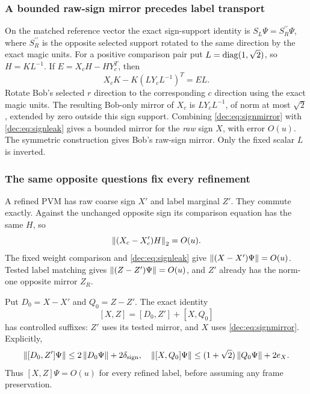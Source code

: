 \subsubsection{A bounded raw-sign mirror precedes label transport}
On the matched reference vector the exact sign-support identity is $S_L\Psi=S^{\prime\prime}_R\Psi$, where $S^{\prime\prime}_R$ is the opposite selected support rotated to the same direction by the exact magic units. For a positive comparison pair put $L=\operatorname{diag}(1,\sqrt2)$, so $H=KL^{-1}$. If $E=X_cH-HY_c^T$, then
\begin{equation}\label{dec:eq:signmirror}
X_cK-K(LY_cL^{-1})^T=EL.
\end{equation}
Rotate Bob's selected $r$ direction to the corresponding $c$ direction using the exact magic units. The resulting Bob-only mirror of $X_c$ is $LY_cL^{-1}$, of norm at most $\sqrt2$, extended by zero outside this sign support. Combining \eqref{dec:eq:signmirror} with \eqref{dec:eq:signleak} gives a bounded mirror for the \emph{raw} sign $X$, with error $O(u)$. The symmetric construction gives Bob's raw-sign mirror. Only the fixed scalar $L$ is inverted.

\subsubsection{The same opposite questions fix every refinement}
A refined PVM has raw coarse sign $X'$ and label marginal $Z'$. They commute exactly. Against the unchanged opposite sign its comparison equation has the same $H$, so
\[
\left\lVert(X_c-X_c')H\right\rVert_2=O(u).
\]
The fixed weight comparison and \eqref{dec:eq:signleak} give $\left\lVert(X-X')\Psi\right\rVert=O(u)$. Tested label matching gives $\left\lVert(Z-Z')\Psi\right\rVert=O(u)$, and $Z'$ already has the norm-one opposite mirror $Z_R$.

Put $D_0=X-X'$ and $Q_0=Z-Z'$. The exact identity
\[
[X,Z]=[D_0,Z']+[X,Q_0]
\]
has controlled suffixes: $Z'$ uses its tested mirror, and $X$ uses \eqref{dec:eq:signmirror}. Explicitly,
\[
\left\lVert[D_0,Z']\Psi\right\rVert\le2\left\lVert D_0\Psi\right\rVert+2\delta_{\rm sign},
\quad
\left\lVert[X,Q_0]\Psi\right\rVert\le(1+\sqrt2)\left\lVert Q_0\Psi\right\rVert+2e_X.
\]
Thus $[X,Z]\Psi=O(u)$ for every refined label, before assuming any frame preservation.

